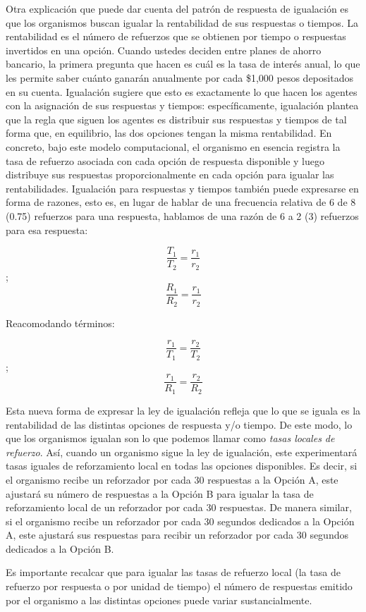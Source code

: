 \documentclass[
  a4paper,
  DIV=11,
  numbers=noendperiod]{scrreprt}
\begin{document}
Otra explicación que puede dar cuenta del patrón de respuesta de
igualación es que los organismos buscan igualar la rentabilidad de sus
respuestas o tiempos. La rentabilidad es el número de refuerzos que se
obtienen por tiempo o respuestas invertidos en una opción. Cuando
ustedes deciden entre planes de ahorro bancario, la primera pregunta que
hacen es cuál es la tasa de interés anual, lo que les permite saber
cuánto ganarán anualmente por cada \$1,000 pesos depositados en su
cuenta. Igualación sugiere que esto es exactamente lo que hacen los
agentes con la asignación de sus respuestas y tiempos: específicamente,
igualación plantea que la regla que siguen los agentes es distribuir sus
respuestas y tiempos de tal forma que, en equilibrio, las dos opciones
tengan la misma rentabilidad. En concreto, bajo este modelo
computacional, el organismo en esencia registra la tasa de refuerzo
asociada con cada opción de respuesta disponible y luego distribuye sus
respuestas proporcionalmente en cada opción para igualar las
rentabilidades. Igualación para respuestas y tiempos también puede
expresarse en forma de razones, esto es, en lugar de hablar de una
frecuencia relativa de 6 de 8 (0.75) refuerzos para una respuesta,
hablamos de una razón de 6 a 2 (3) refuerzos para esa respuesta:

\[\frac {T_1} {T_2} = \frac {r_1} {r_2}\];
\[\frac {R_1} {R_2} = \frac {r_1} {r_2}\]

Reacomodando términos:

\[\frac {r_1}{T_1} = \frac {r_2} {T_2}\] ;
\[\frac {r_1}{R_1} = \frac {r_2} {R_2}\]

Esta nueva forma de expresar la ley de igualación refleja que lo que se
iguala es la rentabilidad de las distintas opciones de respuesta y/o
tiempo. De este modo, lo que los organismos igualan son lo que podemos
llamar como \emph{tasas locales de refuerzo}. Así, cuando un organismo
sigue la ley de igualación, este experimentará tasas iguales de
reforzamiento local en todas las opciones disponibles. Es decir, si el
organismo recibe un reforzador por cada 30 respuestas a la Opción A,
este ajustará su número de respuestas a la Opción B para igualar la tasa
de reforzamiento local de un reforzador por cada 30 respuestas. De
manera similar, si el organismo recibe un reforzador por cada 30
segundos dedicados a la Opción A, este ajustará sus respuestas para
recibir un reforzador por cada 30 segundos dedicados a la Opción B.

Es importante recalcar que para igualar las tasas de refuerzo local (la
tasa de refuerzo por respuesta o por unidad de tiempo) el número de
respuestas emitido por el organismo a las distintas opciones puede
variar sustancialmente.
\end{document}
